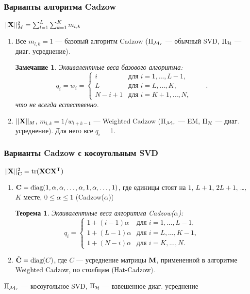 \documentclass[unicode, notheorems]{beamer}
\newtheorem{theorem}{Теорема}
\newtheorem{thnote}{Замечание}
\begin{document}
\begin{frame}
	\frametitle{Варианты алгоритма Cadzow}
	$||\mathbf{X}||^2_M =  \sum_{l = 1}^L \sum_{k = 1}^K m_{l, k}$
	\begin{enumerate}
		\item Все $m_{l, k} = 1$ --- базовый алгоритм Cadzow ($\Pi_{\mathcal{M}_r}$ --- обычный SVD, $\Pi_{\mathcal{H}}$ --- диаг. усреднение).
		\begin{thnote}
			Эквивалентные веса базового алгоритма:
			\begin{equation*}
			q_i = w_i = \begin{cases}
			i & \text{для $i = 1, \ldots, L-1,$}\\
			L & \text{для $i = L, \ldots, K,$}\\
			N - i + 1 & \text{для $i = K + 1, \ldots, N,$}
			\end{cases} \qquad.
			\end{equation*}
			что не всегда естественно.
		\end{thnote}
		\item $||\mathbf{X}||_M$, $m_{l, k} = 1 / w_{l + k - 1}$ --- Weighted Cadzow ($\Pi_{\mathcal{M}_r}$ --- EM, $\Pi_{\mathcal{H}}$ --- диаг. усреднение). Для него все $q_i$ = 1.
	\end{enumerate}
\end{frame}

\begin{frame}
	\frametitle{Варианты Cadzow с косоугольным SVD}
	$||\mathbf{X}||_{\mathbf{C}}^2 = \text{tr}(\mathbf{X} \mathbf{C} \mathbf{X}^{\mathrm{T}})$
	\begin{enumerate}
		\item $\mathbf{C} = \text{diag}(1, \alpha, \alpha, \ldots, \alpha, 1, \alpha, \ldots, 1)$,
		где единицы стоят на $1$, $L + 1$, $2L + 1$, \ldots , $K$ месте, $0 \le \alpha \le 1$ (Cadzow($\alpha$))
		\begin{theorem}
			Эквивалентные веса алгоритма Cadzow($\alpha$):
			\begin{equation*}
			q_i = \begin{cases}
			1 + (i - 1) \alpha & \text{для $i = 1, \ldots, L-1,$}\\
			1 + (L - 1) \alpha & \text{для $i = L, \ldots, K-1,$}\\
			1 + (N - i) \alpha & \text{для $i = K, \ldots, N.$}
			\end{cases}
			\end{equation*}
		\end{theorem}
		\item $\hat {\mathbf{C}} = \text{diag}(C)$, где $C$ --- усреднение матрицы $\mathbf{M}$, примененной в алгоритме Weighted Cadzow, по столбцам (Hat-Cadzow).
	\end{enumerate}
	
	$\Pi_{\mathcal{M}_r}$ --- косоугольное SVD, $\Pi_{\mathcal{H}}$ --- взвешенное диаг. усреднение
\end{frame}
\end{document}
